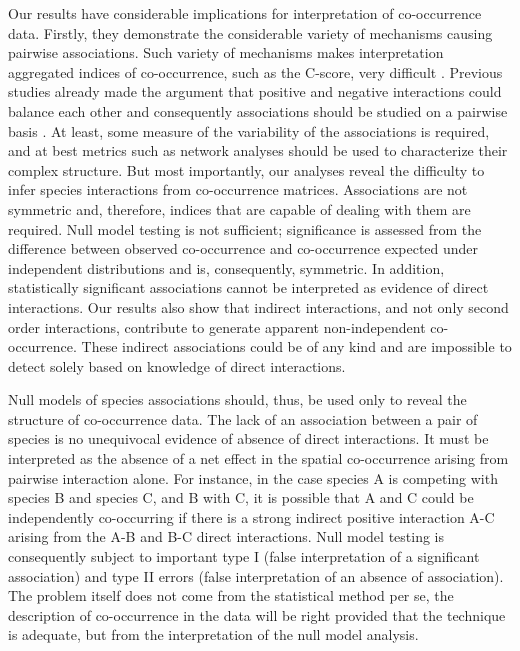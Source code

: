 Our results have considerable implications for interpretation of co-occurrence data. Firstly, they demonstrate the considerable variety of mechanisms causing pairwise associations. Such variety of mechanisms makes interpretation aggregated indices of co-occurrence, such as the C-score, very difficult \citep[see also][]{Araujo2014}. Previous studies already made
the argument that positive and negative interactions could balance each other
\citep{Boulangeat2012} and consequently associations should be
studied on a pairwise basis \citep{Veech2013}. At least, some
measure of the variability of the associations is required, and at best
metrics such as network analyses \citep{Araujo2011} should be used to
characterize their complex structure. But most importantly, our analyses
reveal the difficulty to infer species interactions from co-occurrence
matrices. Associations are not symmetric and, therefore, indices that are capable of dealing with them are required. Null model testing is not sufficient; significance is assessed from the difference between observed co-occurrence and co-occurrence expected under independent distributions and is, consequently, symmetric. In addition, statistically significant associations cannot be interpreted as evidence of direct interactions. Our results also show that indirect interactions, and not only second order interactions, contribute to generate apparent non-independent co-occurrence. These indirect associations could be of any kind and are impossible to detect solely based on knowledge of direct interactions.

Null models of species associations should, thus, be used only to reveal the
structure of co-occurrence data. The lack of an association between a pair of
species is no unequivocal evidence of absence of direct interactions. It must be interpreted as the absence of a net effect in the spatial co-occurrence arising from pairwise interaction alone. For instance, in the case species A is competing with species B and species C, and B with C, it is possible that A and C could be independently co-occurring if there is a strong indirect positive interaction A-C arising from the A-B and B-C direct interactions. Null model testing is consequently
subject to important type I (false interpretation of a significant
association) and type II errors (false interpretation of an absence of
association). The problem itself does not come from the statistical method per
se, the description of co-occurrence in the data will be right provided that
the technique is adequate, but from the interpretation of the null model
analysis.


